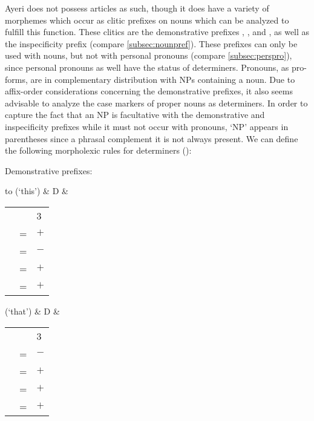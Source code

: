 Ayeri does not possess articles as such, though it does have a variety of 
morphemes which occur as clitic prefixes on nouns which can be analyzed to 
fulfill this function. These clitics are the demonstrative prefixes 
, , and , 
as well as the inspecificity prefix  (compare 
\autoref{subsec:nounpref}). These prefixes can only be used with nouns, but not 
with personal pronouns (compare \autoref{subsec:perspro}), since personal 
pronouns as well have the status of determiners. Pronouns, as pro-forms, are in 
complementary distribution with NPs containing a noun. Due to affix-order 
considerations concerning the demonstrative prefixes, it also seems advisable 
to analyze the case markers of proper nouns as determiners. In order to capture 
the fact that an NP is facultative with the demonstrative and inspecificity 
prefixes while it must not occur with pronouns, `NP' appears in parentheses 
since a phrasal complement it is not always present. We can define the 
following morpholexic rules for determiners ():


\pex
\a\label{ex:dmorphlex-dem}Demonstrative prefixes:\medskip

	\begin{tabu} to 
	 (`this')
		& D
		& \begin{tabular}[t]{l l l}
			\ups{\Pers} & \req{} & 3 \\
			\ups{\Prox} & = & $+$ \\
			\ups{\Dist} & = & $-$ \\
			\ups{\Def} & = & $+$ \\
			\ups{\Spec} & = & $+$ \\
		\end{tabular}
	\end{tabu}\medskip

	\begin{tabu} {\usetabu{morphlex}}
	 (`that')
		& D
		& \begin{tabular}[t]{l l l}
			\ups{\Pers} & \req{} & 3 \\
			\ups{\Prox} & = & $-$ \\
			\ups{\Dist} & = & $+$ \\
			\ups{\Def} & = & $+$ \\
			\ups{\Spec} & = & $+$ \\
		\end{tabular}
	\end{tabu}\medskip
	
